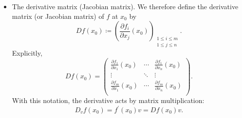 \begin{remark}
\begin{itemize}
\[\begin{pmatrix}
                \vdots \\
                 \sum_{j=1}^n v_j \frac{\partial f_m}{\partial x_j} (x_0) \\
            \end{pmatrix} = \begin{pmatrix}
                 \nabla f_1(x_0) \cdot v  \\
                 \vdots \\
                 \nabla f_m(x_0) \cdot v \\
            \end{pmatrix} = \begin{pmatrix}
                 \nabla f_1(x_0) \\
                 \vdots \\
                 \nabla f_m(x_0) \\
            \end{pmatrix}v
        \]
        \item The derivative matrix (Jacobian matrix). We therefore define the derivative matrix (or Jacobian matrix) of \(f\) at \(x_0\) by 
        \[
            Df(x_0) \coloneqq \left( \frac{\partial f_i}{\partial x_j}(x_0)  \right)_{\substack{1 \le i \le m \\ 1 \le j \le n}}. 
        \]
        Explicitly, 
        \[
            D f(x_0) = \begin{pmatrix}
                \frac{\partial f_1}{\partial x_1} (x_0) & \cdots & \frac{\partial f_1}{\partial x_n} (x_0)  \\
                \vdots & \ddots & \vdots  \\
                \frac{\partial f_m}{\partial x_1} (x_0) & \cdots & \frac{\partial f_m}{\partial x_n} (x_0)  \\
            \end{pmatrix}.
        \]
        With this notation, the derivative acts by matrix multiplication: 
        \[
            D_v f(x_0) = f^{\prime} (x_0) v = D f(x_0) v.
        \]
    \end{itemize}
\end{remark}